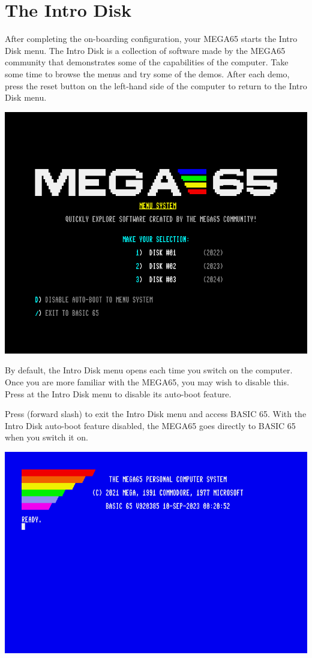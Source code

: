 \section{The Intro Disk}

After completing the on-boarding configuration, your MEGA65 starts the Intro Disk menu. The Intro Disk is a collection of software made by the MEGA65 community that demonstrates some of the capabilities of the computer. Take some time to browse the menus and try some of the demos. After each demo, press the reset button on the left-hand side of the computer to return to the Intro Disk menu.

\begin{center}
  \includegraphics[width=0.7\linewidth]{images/demo_title.png}
\end{center}

By default, the Intro Disk menu opens each time you switch on the computer. Once you are more familiar with the MEGA65, you may wish to disable this. Press  at the Intro Disk menu to disable its auto-boot feature.

Press \megakey{/} (forward slash) to exit the Intro Disk menu and access BASIC 65. With the Intro Disk auto-boot feature disabled, the MEGA65 goes directly to BASIC 65 when you switch it on.

\begin{center}
  \includegraphics[width=0.7\linewidth]{images/img011_final_boot_06.png}
\end{center}

